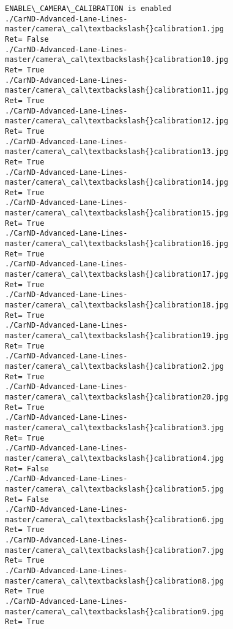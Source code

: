 \documentclass[11pt]{article}
\begin{document}
    \begin{Verbatim}[commandchars=\\\{\}]
ENABLE\_CAMERA\_CALIBRATION is enabled
./CarND-Advanced-Lane-Lines-master/camera\_cal\textbackslash{}calibration1.jpg
Ret= False
./CarND-Advanced-Lane-Lines-master/camera\_cal\textbackslash{}calibration10.jpg
Ret= True
./CarND-Advanced-Lane-Lines-master/camera\_cal\textbackslash{}calibration11.jpg
Ret= True
./CarND-Advanced-Lane-Lines-master/camera\_cal\textbackslash{}calibration12.jpg
Ret= True
./CarND-Advanced-Lane-Lines-master/camera\_cal\textbackslash{}calibration13.jpg
Ret= True
./CarND-Advanced-Lane-Lines-master/camera\_cal\textbackslash{}calibration14.jpg
Ret= True
./CarND-Advanced-Lane-Lines-master/camera\_cal\textbackslash{}calibration15.jpg
Ret= True
./CarND-Advanced-Lane-Lines-master/camera\_cal\textbackslash{}calibration16.jpg
Ret= True
./CarND-Advanced-Lane-Lines-master/camera\_cal\textbackslash{}calibration17.jpg
Ret= True
./CarND-Advanced-Lane-Lines-master/camera\_cal\textbackslash{}calibration18.jpg
Ret= True
./CarND-Advanced-Lane-Lines-master/camera\_cal\textbackslash{}calibration19.jpg
Ret= True
./CarND-Advanced-Lane-Lines-master/camera\_cal\textbackslash{}calibration2.jpg
Ret= True
./CarND-Advanced-Lane-Lines-master/camera\_cal\textbackslash{}calibration20.jpg
Ret= True
./CarND-Advanced-Lane-Lines-master/camera\_cal\textbackslash{}calibration3.jpg
Ret= True
./CarND-Advanced-Lane-Lines-master/camera\_cal\textbackslash{}calibration4.jpg
Ret= False
./CarND-Advanced-Lane-Lines-master/camera\_cal\textbackslash{}calibration5.jpg
Ret= False
./CarND-Advanced-Lane-Lines-master/camera\_cal\textbackslash{}calibration6.jpg
Ret= True
./CarND-Advanced-Lane-Lines-master/camera\_cal\textbackslash{}calibration7.jpg
Ret= True
./CarND-Advanced-Lane-Lines-master/camera\_cal\textbackslash{}calibration8.jpg
Ret= True
./CarND-Advanced-Lane-Lines-master/camera\_cal\textbackslash{}calibration9.jpg
Ret= True

    \end{Verbatim}

    \begin{center}
    \end{center}
    { \hspace*{\fill} \\}
    
    \begin{center}
    \end{center}
    { \hspace*{\fill} \\}
    
\end{document}
